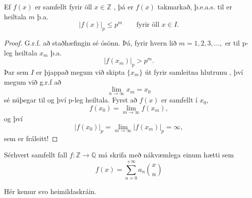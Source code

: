 \begin{setn}
Ef $f(x)$ er samfellt fyrir öll $x\in \mathbb{Z}$ , þá er $f(x)$ takmarkað, þ.e.a.s. til er heiltala $m$ þ.a. 
\begin{equation*}
|f(x) |_p \leq p^m \qquad \mbox{fyrir öll   } x\in I.
\end{equation*}
\end{setn}
\begin{proof}
G.r.f. að staðhæfingin sé ósönn. Þá, fyrir hvern lið $m=1,2,3,\ldots,$ er til p-leg heiltala $x_m$ þ.a.
\begin{equation*}
|f(x_m)|_p > p^m.
\end{equation*}
Þar sem $I$ er þjappað megum við skipta $\{x_m\}$ út fyrir samleitna hlutrunu , því megum við g.r.f að 
\begin{equation*}
\lim_{n \rightarrow \infty} x_m = x_0
\end{equation*}
sé núþegar til og því p-leg heiltala. Fyrst að $f(x)$ er samfellt í $x_0$,
\begin{equation*}
f(x_0) = \lim_{m\rightarrow \infty} f(x_m),
\end{equation*}
og því 
\begin{equation*}
|f(x_0)|_p = \lim_{m \rightarrow \infty} |f(x_m)|_p = \infty,
\end{equation*}
sem er fráleitt!
\end{proof}

\begin{setn}
Sérhvert samfellt fall $f:\mathbb{Z} \rightarrow \mathbb{Q}$ má skrifa með nákvæmlega einum hætti sem
\begin{equation*}
f(x) = \sum_{n=0}^{+\infty} a_n \binom{x}{n}
\end{equation*} 
\end{setn}
\newpage
Hér kemur svo heimildaskráin.

